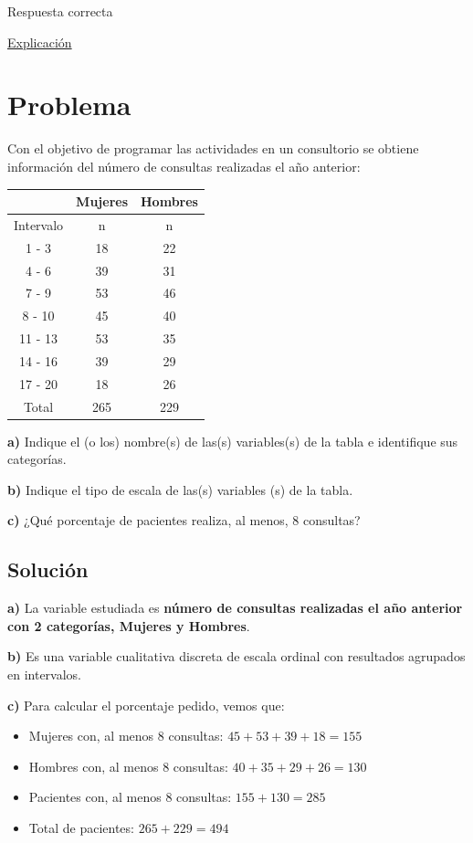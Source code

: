 \documentclass[
]{book}
\begin{document}
Respuesta correcta

\href{https://1fjmanzano.github.io/bioestadistica/inferencia-estad\%C3\%ADstica.html}{Explicación}

\hypertarget{problema-2}{%
\section{Problema}\label{problema-2}}

Con el objetivo de programar las actividades en un consultorio se obtiene información del número de consultas realizadas el año anterior:

\begin{longtable}[]{@{}ccc@{}}
\toprule
& Mujeres & Hombres\tabularnewline
\midrule
\endhead
Intervalo & n & n\tabularnewline
1 - 3 & 18 & 22\tabularnewline
4 - 6 & 39 & 31\tabularnewline
7 - 9 & 53 & 46\tabularnewline
8 - 10 & 45 & 40\tabularnewline
11 - 13 & 53 & 35\tabularnewline
14 - 16 & 39 & 29\tabularnewline
17 - 20 & 18 & 26\tabularnewline
Total & 265 & 229\tabularnewline
\bottomrule
\end{longtable}

\textbf{a)} Indique el (o los) nombre(s) de las(s) variables(s) de la tabla e identifique sus categorías.

\textbf{b)} Indique el tipo de escala de las(s) variables (s) de la tabla.

\textbf{c)} ¿Qué porcentaje de pacientes realiza, al menos, 8 consultas?

\hypertarget{soluciuxf3n-2}{%
\subsection{Solución}\label{soluciuxf3n-2}}

\textbf{a)} La variable estudiada es \textbf{número de consultas realizadas el año anterior con 2 categorías, Mujeres y Hombres}.

\textbf{b)} Es una variable cualitativa discreta de escala ordinal con resultados agrupados en intervalos.

\textbf{c)} Para calcular el porcentaje pedido, vemos que:

\begin{itemize}
\item
  Mujeres con, al menos 8 consultas: \(45 + 53 + 39 + 18 = 155\)
\item
  Hombres con, al menos 8 consultas: \(40 + 35 + 29 + 26 = 130\)
\item
  Pacientes con, al menos 8 consultas: \(155 + 130 = 285\)
\item
  Total de pacientes: \(265 + 229 = 494\)
\end{itemize}
\end{document}
